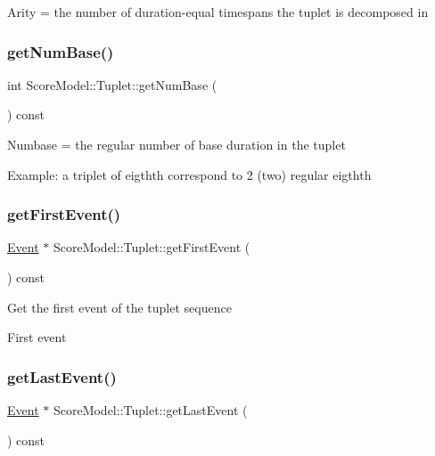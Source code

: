 Arity = the number of duration-\/equal timespans the tuplet is decomposed in \mbox{\label{classScoreModel_1_1Tuplet_a6a62f30eaf94ab7b329882552cf96a68}} 
\subsubsection{\texorpdfstring{getNumBase()}{getNumBase()}}
{\footnotesize\ttfamily int Score\+Model\+::\+Tuplet\+::get\+Num\+Base (\begin{DoxyParamCaption}{ }\end{DoxyParamCaption}) const}

Numbase = the regular number of base duration in the tuplet

Example\+: a triplet of eigthth correspond to 2 (two) regular eigthth \mbox{\label{classScoreModel_1_1Tuplet_a4c0ccffd5ee162176ad7dfcef1a9cd58}} 
\subsubsection{\texorpdfstring{getFirstEvent()}{getFirstEvent()}}
{\footnotesize\ttfamily \mbox{\hyperlink{classScoreModel_1_1Event}{Event}} $\ast$ Score\+Model\+::\+Tuplet\+::get\+First\+Event (\begin{DoxyParamCaption}{ }\end{DoxyParamCaption}) const}

Get the first event of the tuplet sequence

First event \mbox{\label{classScoreModel_1_1Tuplet_acd616d4a0464012de5e3125ed318fd30}} 
\subsubsection{\texorpdfstring{getLastEvent()}{getLastEvent()}}
{\footnotesize\ttfamily \mbox{\hyperlink{classScoreModel_1_1Event}{Event}} $\ast$ Score\+Model\+::\+Tuplet\+::get\+Last\+Event (\begin{DoxyParamCaption}{ }\end{DoxyParamCaption}) const}

